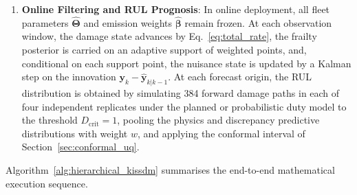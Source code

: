 \documentclass[a4paper,fleqn]{cas-dc}
\newcommand{\Dcrit}{D_{\mathrm{crit}}}
\begin{document}
\begin{enumerate}[label=\textbf{Stage \arabic*:},leftmargin=3.0em]
    where $z_q$ and $w_q$ denote the standard Gauss-Hermite quadrature nodes and weights ($Q = 25$). At each quadrature node, the deterministic damage trajectory $\mathbf{D}_u(\eta_u)$ is evaluated via RK4 integration of Eq.~\eqref{eq:total_rate}. Conditioning on $\mathbf{D}_u(\eta_u)$, emission weights $\boldsymbol{\beta}$ are profiled out in closed form across all units via the pooled GLS estimator in Eq.~\eqref{eq:gls_solution}. The conditional density $p(\mathbf{y}_u \mid \mathbf{D}_u(\eta_u), \hat{\boldsymbol{\beta}}, \boldsymbol{\Theta})$ is then evaluated in exact $O(K_u)$ time via the Kalman innovations representation in Eq.~\eqref{eq:kalman_innovations}. Fleet hyper-parameters $\boldsymbol{\Theta}$ are optimised by a projected quasi-Newton (BFGS) method with central finite-difference gradients, an Armijo line search, and box and $\ell_1$-ball constraints, alternated with closed-form updates of the emission and noise parameters, until strict stationarity criteria are satisfied ($\|\nabla \mathcal{L}\| \le 5 \times 10^{-5}$ for Exitflag~1, or $< 5 \times 10^{-4}$ for Exitflag~2).
    \item \textbf{Online Filtering and RUL Prognosis}: In online deployment, all fleet parameters $\hat{\boldsymbol{\Theta}}$ and emission weights $\hat{\boldsymbol{\beta}}$ remain frozen. At each observation window, the damage state advances by Eq.~\eqref{eq:total_rate}, the frailty posterior is carried on an adaptive support of weighted points, and, conditional on each support point, the nuisance state is updated by a Kalman step on the innovation $\mathbf{y}_k - \hat{\mathbf{y}}_{k|k-1}$. At each forecast origin, the RUL distribution is obtained by simulating 384 forward damage paths in each of four independent replicates under the planned or probabilistic duty model to the threshold $\Dcrit = 1$, pooling the physics and discrepancy predictive distributions with weight $w$, and applying the conformal interval of Section~\ref{sec:conformal_uq}.
\end{enumerate}

Algorithm~\ref{alg:hierarchical_kissdm} summarises the end-to-end mathematical execution sequence.
\end{document}
